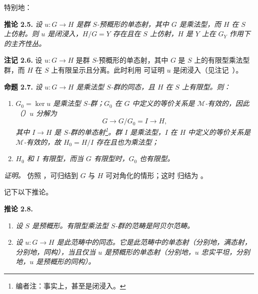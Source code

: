 特别地：

\medskip
\noindent{}\textbf{推论 2.5.}
\textit{设 \(u:G\to H\) 是群 \(S\)-预概形的单态射，其中 \(G\) 是乘法型，而 \(H\) 在 \(S\) 上仿射。则 \(u\) 是闭浸入，\(H/G=Y\) 存在且在 \(S\) 上仿射，\(H\) 是 \(Y\) 上在 \(G_Y\) 作用下的主齐性丛。}

\medskip
\noindent{}\textbf{注记 2.6.}
设 \(u:G\to H\) 是群 \(S\)-预概形的单态射，其中 \(G\) 是 \(S\) 上的有限型乘法型群，而 \(H\) 在 \(S\) 上有限呈示且分离。此时利用  可证明 \(u\) 是闭浸入（见注记~）。

\medskip
\noindent{}\textbf{命题 2.7.}
\textit{设 \(u:G\to H\) 是乘法型 \(S\)-群的同态，且 \(H\) 在 \(S\) 上有限型。则：}
\begin{enumerate}
  \item[(i)]
  \textit{\(G_0=\ker u\) 是乘法型 \(S\)-群；\(G_0\) 在 \(G\) 中定义的等价关系是 \(\mathcal M\)-有效的，因此（）\(u\) 分解为}
  \[
    G\longrightarrow G/G_0=I\longrightarrow H,
  \]
  \textit{其中 \(I\to H\) 是 \(S\)-群的单态射\footnote{编者注：事实上，甚至是闭浸入。}。群 \(I\) 是乘法型，\(I\) 在 \(H\) 中定义的等价关系是 \(\mathcal M\)-有效的，故 \(H_0=H/I\) 存在且也为乘法型；}

  \item[(ii)]
  \textit{\(H_0\) 和 \(I\) 有限型，而当 \(G\) 有限型时，\(G_0\) 也有限型。}
\end{enumerate}

\emph{证明。}
仿照 ，可归结到 \(G\) 与 \(H\) 可对角化的情形；这时  归结为 。

记下以下推论。

\medskip
\noindent{}\textbf{推论 2.8.}
\begin{enumerate}
  \item[(a)]
  \textit{设 \(S\) 是预概形。有限型乘法型 \(S\)-群的范畴是阿贝尔范畴。}

  \item[(b)]
  \textit{设 \(u:G\to H\) 是此范畴中的同态。它是此范畴中的单态射（分别地，满态射，分别地，同构），当且仅当 \(u\) 是预概形的单态射（分别地，\(u\) 忠实平坦，分别地，\(u\) 是预概形的同构）。}
\end{enumerate}

